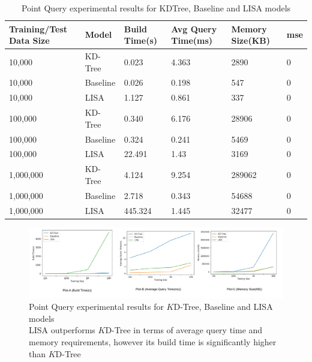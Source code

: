 \begin{table}
	\centering
\centering
	\begin{tabular}{||p{}<{\centering}|p{}<{\centering}|p{}<{\centering}|p{}<{\centering}|p{}<{\centering}|p{}<{\centering}||}
		\hline
		Training/Test Data Size& Model & Build Time(s) & Avg Query Time(ms) & Memory Size(KB)&mse\\ [0.5ex] 
		\hline
		\hline
	 	10,000& KD-Tree & 0.023 & 4.363 & 2890 & 0\\
	 	\hline
	 	10,000& Baseline & 0.026 & 0.198 & 547&0\\
	 	\hline
	 	10,000& LISA & 1.127&0.861 & 337&0\\
		\hline
	 	100,000& KD-Tree & 0.340 & 6.176 & 28906 &0\\
	 	\hline
	 	100,000& Baseline & 0.324 & 0.241 & 5469&0\\
	 	\hline
	 	100,000& LISA& 22.491& 1.43 & 3169&0\\
		\hline
	 	1,000,000& KD-Tree& 4.124 & 9.254 & 289062 &0\\
	 	\hline
	 	1,000,000& Baseline& 2.718 & 0.343 & 54688&0\\
	 	\hline
	 	1,000,000& LISA& 445.324&1.445 & 32477&0\\
	 	
		\hline
		\hline
	\end{tabular}
	\caption{Point Query experimental results for KDTree, Baseline and LISA models}
	\label{Point_Query_Comparision}
\end{table}

\begin{figure}[t]
    \centering
    \includegraphics[width=1.1\textwidth]{graphs/evaluation/PointQueryPlot.pdf}
    \caption{Point Query experimental results for $K$D-Tree, Baseline and LISA models\\
    LISA outperforms $K$D-Tree in terms of average query time and memory requirements, however its build time is significantly higher than $K$D-Tree }
    \label{fig:Point_Query_Comparision}
\end{figure}
